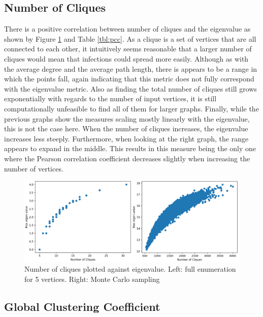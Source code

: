 \documentclass[11pt]{article}
\theoremstyle{definition}
\begin{document}
\subsection{Number of Cliques}

There is a positive correlation between number of cliques and the eigenvalue as shown by Figure \ref{fig:measure_nql} and Table \ref{tbl:pcc}. As a clique is a set of vertices that are all connected to each other, it intuitively seems reasonable that a larger number of cliques would mean that infections could spread more easily. Although as with the average degree and the average path length, there is appears to be a range in which the points fall, again indicating that this metric does not fully correspond with the eigenvalue metric. Also as finding the total number of cliques still grows exponentially with regards to the number of input vertices, it is still computationally unfeasible to find all of them for larger graphs. 
Finally, while the previous graphs show the measures scaling mostly linearly with the eigenvalue, this is not the case here. When the number of cliques increases, the eigenvalue increases less steeply. Furthermore, when looking at the right graph, the range appears to expand in the middle. This results in this measure being the only one where the Pearson correlation coefficient decreases slightly when increasing the number of vertices.

\begin{figure}[h!]
  \centering
    \includegraphics[width=1\textwidth]{results_graph_measures/Number_of_Cliques_c}

  \caption{Number of cliques plotted against eigenvalue. Left: full enumeration for 5 vertices. Right: Monte Carlo sampling}
  \label{fig:measure_nql}
\end{figure}

\subsection{Global Clustering Coefficient}
\end{document}

